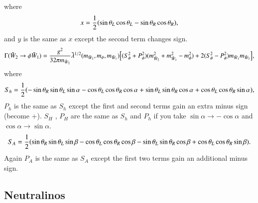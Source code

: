 \documentclass[final,3p,times,pdflatex]{elsarticle}
\begin{document}
where
\begin{equation}
x = {1 \over 2}(\sin \theta_L \cos \theta_L - \sin \theta_R \cos \theta_R),
\end{equation}
and $y$ is the same as $x$ except the second term changes sign.
\begin{equation}\label{ch2phich1}
\Gamma (\tilde{W}_2 \rightarrow \phi \tilde{W}_1) = {g^2 \over 32\pi m_{\tilde{W}_2} } \tilde{\lambda}^{1/2} (m_{\tilde{W}_2}, m_{\phi}, m_{\tilde{W}_1}) \Big[(S_{\phi}^2 + P_{\phi}^2) (m_{\tilde{W}_{2}}^2  + m_{\tilde{W}_{1}}^2 - m_{\phi}^2)  + 2(S_{\phi}^2 -P_{\phi}^2)m_{\tilde{W}_{1}}m_{\tilde{W}_{2}}\Big],
\end{equation} 
where
\begin{equation}
S_h = {1 \over 2} (-\sin \theta_R \sin \theta_L \sin \alpha - \cos \theta_L \cos \theta_R \cos \alpha + \sin \theta_L \sin \theta_R \cos \alpha + \cos \theta_L \cos \theta_R \sin \alpha )  ,
\end{equation}
$P_h$ is the same as $S_h$ except the first and second terms gain an extra minus sign (become +).
$S_H$ , $P_H$ are the same as $S_h$ and $P_h$ if you take $\sin\alpha \rightarrow -\cos\alpha$ and $\cos\alpha \rightarrow \sin\alpha$.
\begin{equation}
S_A = {1 \over 2} (\sin \theta_R \sin \theta_L \sin \beta - \cos \theta_L \cos \theta_R \cos \beta - \sin \theta_L \sin \theta_R \cos \beta + \cos \theta_L \cos \theta_R \sin \beta ).
\end{equation}
Again $P_A$ is the same as $S_A$ except the first two terms gain an additional minus sign.
\subsection{Neutralinos} \label{Neutralinos}
\end{document}
